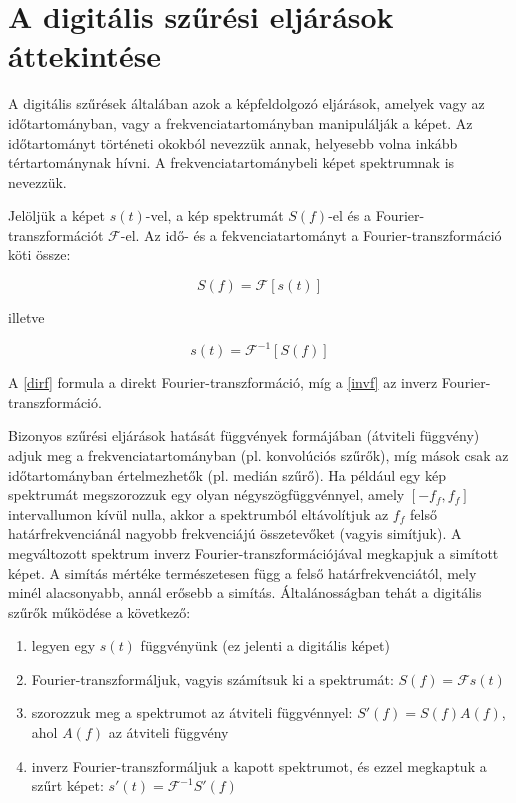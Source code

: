 \documentclass[a4paper,12pt]{article}
\begin{document}
\section{A digitális szűrési eljárások áttekintése} \label{filters_desc}

A digitális szűrések általában azok a képfeldolgozó eljárások, amelyek vagy az időtartományban, vagy a frekvenciatartományban manipulálják a képet. Az időtartományt történeti okokból nevezzük annak, helyesebb volna inkább tértartománynak hívni. A frekvenciatartománybeli képet spektrumnak is nevezzük.

Jelöljük a képet $s(t)$-vel, a kép spektrumát $S(f)$-el és a Fourier-transzformációt $\mathcal{F}$-el. Az idő- és a fekvenciatartományt a Fourier-transzformáció köti össze: 

\begin{equation} \label{dirf}
S(f) = \mathcal{F} [s(t)]
\end{equation}

illetve

\begin{equation} \label{invf}
s(t) = \mathcal{F}^{-1} [S(f)]
\end{equation}

A \ref{dirf} formula a direkt Fourier-transzformáció, míg a \ref{invf} az inverz
Fourier-transzformáció.

Bizonyos szűrési eljárások hatását függvények formájában (átviteli függvény)
adjuk meg a frekvenciatartományban (pl. konvolúciós szűrők), míg mások csak az
időtartományban értelmezhetők (pl. medián szűrő). Ha például egy kép spektrumát
megszorozzuk egy olyan négyszögfüggvénnyel, amely $[-f_f, f_f]$ intervallumon
kívül nulla, akkor a spektrumból eltávolítjuk az $f_f$ felső határfrekvenciánál
nagyobb frekvenciájú összetevőket (vagyis simítjuk). A megváltozott spektrum
inverz Fourier-transzformációjával megkapjuk a simított képet. A simítás mértéke
természetesen függ a felső határfrekvenciától, mely minél alacsonyabb, annál
erősebb a simítás.
Általánosságban tehát a digitális szűrők működése a következő:

\begin{enumerate}
	\item legyen egy $s(t)$ függvényünk (ez jelenti a digitális képet)
	\item Fourier-transzformáljuk, vagyis számítsuk ki a spektrumát:
	$S(f)=\mathcal{F} s(t)$
	\item szorozzuk meg a spektrumot az átviteli függvénnyel: $S'(f) = S(f) A(f)$,
	ahol $A(f)$ az átviteli függvény
	\item inverz Fourier-transzformáljuk a kapott spektrumot, és ezzel megkaptuk a
	szűrt képet: $s'(t) = \mathcal{F}^{-1} S'(f)$
\end{enumerate}
\end{document}
